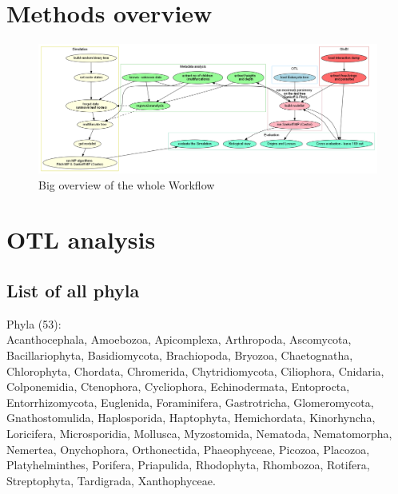   \section{Methods overview}
    \begin{figure}[h!]
      \centering
      \includegraphics[width=\textwidth]{Figures/Workflow.png}
      \caption{Big overview of the whole Workflow}
      \label{fig:BigWorkflow}
    \end{figure}

  \section{OTL analysis}\label{sec:appendix - otl analysis}

    \subsection{List of all phyla}\label{subsec:listPhyla}

    Phyla (53): \\
    Acanthocephala, Amoebozoa, Apicomplexa, Arthropoda, Ascomycota, Bacillariophyta, Basidiomycota, 
      Brachiopoda, Bryozoa, Chaetognatha, Chlorophyta, Chordata, Chromerida, Chytridiomycota, 
      Ciliophora, Cnidaria, Colponemidia, Ctenophora, Cycliophora, Echinodermata, Entoprocta, 
      Entorrhizomycota, Euglenida, Foraminifera, Gastrotricha, Glomeromycota, Gnathostomulida, 
      Haplosporida, Haptophyta, Hemichordata, Kinorhyncha, Loricifera, Microsporidia, Mollusca, 
      Myzostomida, Nematoda, Nematomorpha, Nemertea, Onychophora, Orthonectida, Phaeophyceae, 
      Picozoa, Placozoa, Platyhelminthes, Porifera, Priapulida, Rhodophyta, Rhombozoa, Rotifera, 
      Streptophyta, Tardigrada, Xanthophyceae.

